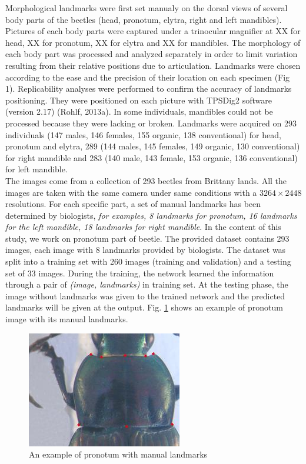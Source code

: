 \documentclass[review]{elsarticle}
\begin{document}
Morphological landmarks were first set manualy on the dorsal views of several body parts of the beetles (head, pronotum, elytra, right and left mandibles). Pictures of each body parts were captured under a trinocular magnifier at XX for head, XX for pronotum, XX for elytra and XX for mandibles. The morphology of each body part was processed and analyzed separately in order to limit variation resulting from their relative positions due to articulation. Landmarks were chosen according to the ease and the precision of their location on each specimen (Fig 1). Replicability analyses were performed to confirm the accuracy of landmarks positioning. They were positioned on each picture with TPSDig2 software (version 2.17) (Rohlf, 2013a). In some individuals, mandibles could not be processed because they were lacking or broken. Landmarks were acquired on 293 individuals (147 males, 146 females, 155 organic, 138 conventional) for head, pronotum and elytra, 289 (144 males, 145 females, 149 organic, 130 conventional) for right mandible and 283 (140 male, 143 female, 153 organic, 136 conventional) for left mandible.  \\

The images come from a collection of 293 beetles from Brittany lands. All the images are taken with the same camera under same conditions with a $3264 \times 2448$ resolutions. For each specific part, a set of manual landmarks has been determined by biologists, \textit{for examples, 8 landmarks for pronotum, 16 landmarks for the left mandible, 18 landmarks for right mandible}. In the content of this study, we work on pronotum part of beetle. The provided dataset contains 293 images, each image with 8 landmarks provided by biologists. The dataset was split into a training set with 260 images (training and validation) and a testing set of 33 images. During the training, the network learned the information through a pair of \textit{(image, landmarks)} in training set. At the testing phase, the image without landmarks was given to the trained network and the predicted landmarks will be given at the output. Fig. \ref{figpronotum} shows an example of pronotum image with its manual landmarks.

\begin{figure}[htbp]
	\centerline{\includegraphics[scale=0.8]{images/pronotum}}
	\caption{An example of pronotum with manual landmarks}
	\label{figpronotum}
\end{figure}
\end{document}
